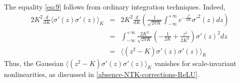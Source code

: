 The equality \eqref{eq:9} follows from ordinary integration techniques. Indeed,
\begin{eqnarray}
    2K^{2}\frac{d}{dK}\langle \sigma'(z)\sigma'(z)\rangle_{K} &=& 2K^{2}\frac{d}{dK}\left( \frac{1}{\sqrt{2\pi K}}\int_{-\infty}^{+\infty}e^{-\frac{z^{2}}{2K}}\sigma'^{2}(z)dz\right)\nonumber\\
    &=& \int_{-\infty}^{+\infty}\frac{2K^{2}}{\sqrt{2\pi K}}\left(-\frac{1}{2K} + \frac{z^{2}}{2K^{2}}\right)\sigma'(z)^{2}dz\nonumber\\
    &=& \langle (z^{2} - K)\sigma'(z)\sigma'(z)\rangle_{K}
\end{eqnarray}
Thus, the Gaussian $\langle (z^{2} - K)\sigma'(z)\sigma'(z)\rangle_{K}$ vanishes for scale-invariant nonlinearities, as discussed in \ref{absence-NTK-corrections-ReLU}.
